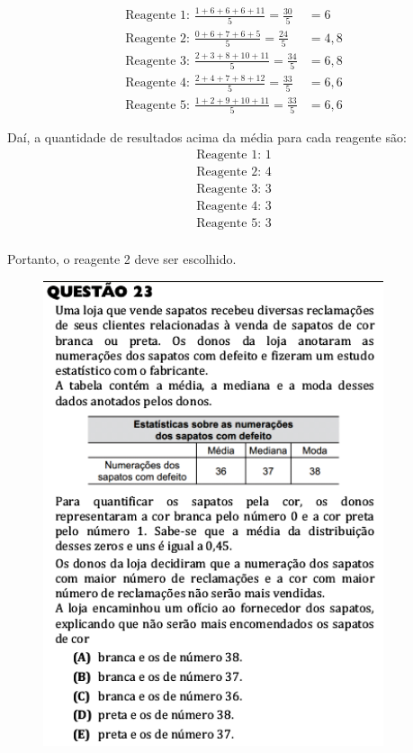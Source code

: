 \documentclass[a4paper]{article}
\begin{document}
\begin{align*}
\text{Reagente 1: }\frac{1 + 6 + 6 + 6 + 11}{5} = \frac{30}{5} &= 6 \\
\text{Reagente 2: }\frac{0 + 6 + 7 + 6 + 5}{5} = \frac{24}{5} &= 4,8 \\
\text{Reagente 3: }\frac{2 + 3 + 8 + 10 + 11}{5} = \frac{34}{5} &= 6,8 \\
\text{Reagente 4: }\frac{2 + 4 + 7 + 8 + 12}{5} = \frac{33}{5} &= 6,6 \\
\text{Reagente 5: }\frac{1 + 2 + 9 + 10 + 11}{5} = \frac{33}{5} &= 6,6 
\end{align*}
\par\vspace{0.3cm} Daí, a quantidade de resultados acima da média para cada reagente são:
\begin{align*}
\text{Reagente 1: }1 \\
\text{Reagente 2: }4 \\
\text{Reagente 3: }3 \\
\text{Reagente 4: }3 \\
\text{Reagente 5: }3 \\
\end{align*}
\par\vspace{0.3cm} Portanto, o reagente 2 deve ser escolhido.
\begin{figure}[H]
	\begin{center}
		\includegraphics[width=10cm]{L1Q23.png}
	\end{center}
\end{figure}
\end{document}
